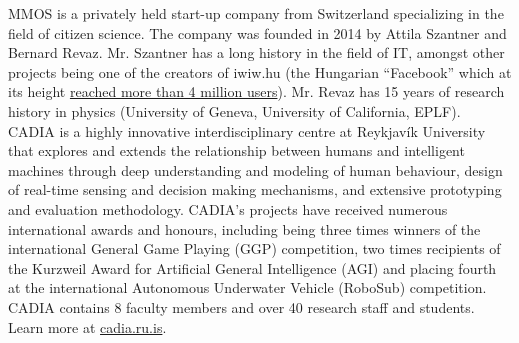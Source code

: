 \documentclass[11pt]{article}
\begin{document}
MMOS is a privately held start-up company from Switzerland specializing in the field
of citizen science. The company was founded in 2014 by Attila Szantner and
Bernard Revaz. Mr. Szantner has a long history in the field of IT, amongst other
projects being one of the creators of iwiw.hu (the Hungarian “Facebook” which at its
height \href{http://en.wikipedia.org/wiki/IWiW}{reached more than 4 million users}). Mr.
Revaz has 15 years of research history in physics (University of Geneva, University
of California, EPLF).\\


CADIA is a highly innovative interdisciplinary centre at Reykjavík University that
explores and extends the relationship between humans and intelligent machines
through deep understanding and modeling of human behaviour, design of real-time
sensing and decision making mechanisms, and extensive prototyping and evaluation
methodology. CADIA’s projects have received numerous international awards and
honours, including being three times winners of the international General Game
Playing (GGP) competition, two times recipients of the Kurzweil Award for Artificial
General Intelligence (AGI) and placing fourth at the international Autonomous
Underwater Vehicle (RoboSub) competition. CADIA contains 8 faculty members and
over 40 research staff and students. Learn more at \href{http://cadia.ru.is/}{cadia.ru.is}.
\end{document}
